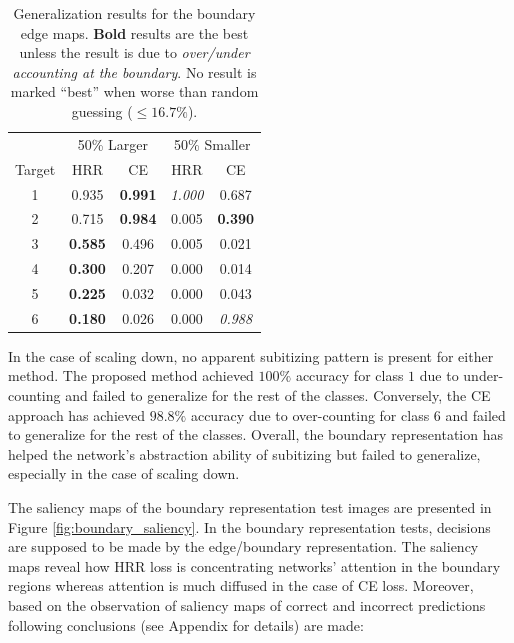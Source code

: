 \documentclass[letterpaper]{article} %
\begin{document}
\begin{table}[!htbp]%
\centering
\begin{tabular}{@{}ccccc@{}}
\toprule
       & \multicolumn{2}{c}{50\% Larger} & \multicolumn{2}{c}{50\% Smaller } \\ \cmidrule(lr){2-3} \cmidrule(lr){4-5}
Target & HRR                 & CE                  & HRR                  & CE                  \\ \midrule
1      & 0.935               & \textbf{0.991}      & \textit{1.000}       & 0.687               \\
2      & 0.715               & \textbf{0.984}      & 0.005                & \textbf{0.390}      \\
3      & \textbf{0.585}      & 0.496               & 0.005                & 0.021               \\
4      & \textbf{0.300}      & 0.207               & 0.000                & 0.014               \\
5      & \textbf{0.225}      & 0.032               & 0.000                & 0.043               \\
6      & \textbf{0.180}      & 0.026               & 0.000                & \textit{0.988}      \\ \bottomrule
\end{tabular}
\caption{Generalization results for the boundary edge maps. \textbf{Bold} results are the best unless the result is due to  \textit{over/under accounting at the boundary}. No result is marked ``best'' when worse than random guessing ($\leq 16.7\%$).}
\label{tab:boundaryResults}
\end{table}

In the case of scaling down, no apparent subitizing pattern is present for either method. The proposed method achieved $100\%$ accuracy for class $1$ due to under-counting and failed to generalize for the rest of the classes. Conversely, the CE approach has achieved $98.8\%$ accuracy due to over-counting for class $6$ and failed to generalize for the rest of the classes. Overall, the boundary representation has helped the network’s abstraction ability of subitizing but failed to generalize, especially in the case of scaling down.
\par 
The saliency maps of the boundary representation test images are presented in Figure \ref{fig:boundary_saliency}. In the boundary representation tests, decisions are supposed to be made by the edge/boundary representation. The saliency maps reveal how HRR loss is concentrating networks' attention in the boundary regions whereas attention is much diffused in the case of CE loss. Moreover, based on the observation of saliency maps of correct and incorrect predictions following conclusions (see Appendix for details) are made: 
\end{document}
